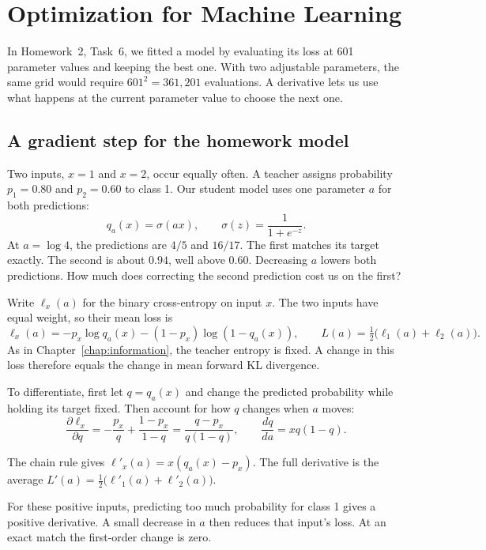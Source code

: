 \chapter{Optimization for Machine Learning}
\label{chap:optimization}

In Homework~2, Task~6, we fitted a model by evaluating its loss at 601
parameter values and keeping the best one. With two adjustable parameters,
the same grid would require \(601^2=361{,}201\) evaluations. A derivative
lets us use what happens at the current parameter value to choose the next one.

\section{A gradient step for the homework model}
Two inputs, \(x=1\) and \(x=2\), occur equally often. A teacher assigns
probability \(p_1=0.80\) and \(p_2=0.60\) to class 1. Our student model uses
one parameter \(a\) for both predictions:
\[
  q_a(x)=\sigma(ax),\qquad \sigma(z)=\frac{1}{1+e^{-z}}.
\]
At \(a=\log 4\), the predictions are \(4/5\) and \(16/17\). The first
matches its target exactly. The second is about \(0.94\), well above \(0.60\).
Decreasing \(a\) lowers both predictions. How much does correcting the
second prediction cost us on the first?

Write \(\ell_x(a)\) for the binary cross-entropy on input \(x\).
The two inputs have equal weight, so their mean loss is
\[
 \ell_x(a)=-p_x\log q_a(x)-(1-p_x)\log(1-q_a(x)),\qquad
 L(a)=\tfrac12\bigl(\ell_1(a)+\ell_2(a)\bigr).
\]
As in Chapter~\ref{chap:information}, the teacher entropy is fixed. A change
in this loss therefore equals the change in mean forward KL divergence.

To differentiate, first let \(q=q_a(x)\) and change the predicted
probability while holding its target fixed. Then account for how \(q\)
changes when \(a\) moves:
\[
 \frac{\partial\ell_x}{\partial q}
   =-\frac{p_x}{q}+\frac{1-p_x}{1-q}
   =\frac{q-p_x}{q(1-q)},\qquad
 \frac{dq}{da}=xq(1-q).
\]
\begin{result}
The chain rule gives \(\ell'_x(a)=x(q_a(x)-p_x)\).
The full derivative is the average
\(L'(a)=\tfrac12\bigl(\ell'_1(a)+\ell'_2(a)\bigr)\).
\end{result}
For these positive inputs, predicting too much probability for class 1 gives
a positive derivative. A small decrease in \(a\) then reduces that input's
loss. At an exact match the first-order change is zero.

